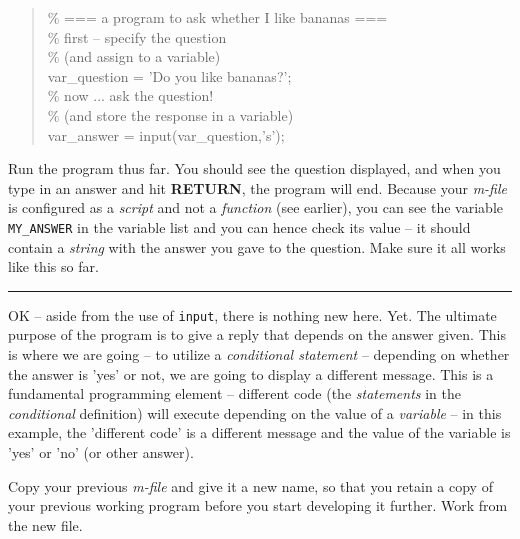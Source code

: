 \documentclass{tufte-book} %
\newenvironment{docspec}{\begin{quotation}\ttfamily\parskip0pt\parindent0pt\ignorespaces}{\end{quotation}}
\begin{document}
\begin{docspec}
\textcolor[rgb]{0,0.501961,0}{\% === a program to ask whether I like bananas ===
\\\% first -- specify the question 
\\\% (and assign to a variable)}
\\var\_question\textcolor[rgb]{1,0,1}{ = 'Do you like bananas?'};
\textcolor[rgb]{0,0.501961,0}{\\\% now ... ask the question!
\\\% (and store the response in a variable)}
\\var\_answer = input(var\_question,\textcolor[rgb]{1,0,1}{'s'});
\end{docspec}

Run the program thus far. You should see the question displayed, and when you type in an answer and hit \textbf{RETURN}, the program will end. Because your \textit{m-file} is configured as a \textit{script} and not a \textit{function} (see earlier), you can see the variable \texttt{MY\_ANSWER} in the variable list and you can hence check its value -- it should contain a \textit{string} with the answer you gave to the question. Make sure it all works like this so far.

\vspace{1mm}
\noindent\rule{2cm}{0.5pt}
\vspace{2mm}

\noindent OK -- aside from the use of \texttt{input}, there is nothing new here. Yet. The ultimate purpose of the program is to give a reply that depends on the answer given. This is where we are going -- to utilize a \textit{conditional statement} -- depending on whether the answer is 'yes' or not, we are going to display a different message. This is a fundamental programming element -- different code (the \textit{statements} in the \textit{conditional} definition) will execute depending on the value of a \textit{variable} -- in this example, the 'different code' is a different message and the value of the variable is 'yes' or 'no' (or other answer).

Copy your previous \textit{m-file} and give it a new name, so that you retain a copy of your previous working program before you start developing it further. Work from the new file.
\end{document}
